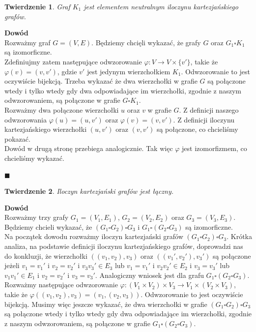 \documentclass[12pt,a4paper,titlepage]{article}
\newtheorem{twr}{Twierdzenie}
\newcommand\tab[1][1cm]{\hspace*{#1}}
\begin{document}
\begin{twr}
Graf $K_1$ jest elementem neutralnym iloczynu kartezjańskiego grafów.
\end{twr}
\tab[-0.6cm]\textbf{Dowód}\\
\tab[0.6cm]Rozważmy graf $G=(V, E)$. Będziemy chcięli wykazać, że grafy $G$ oraz $G_1 \square K_1$ są izomorficzne. \\
\tab[0.6cm]Zdefiniujmy zatem następujące odwzorowanie $\varphi : V \rightarrow V \times \{v'\}$, takie że $\varphi(v) = (v, v')$, gdzie $v'$ jest jedynym wierzchołkiem $K_1$. Odwzorowanie to jest oczywiście bijekcją. Trzeba wykazać że dwa wierzchołki w grafie $G$ są połączone wtedy i tylko wtedy gdy dwa odpowiadające im wierzchołki, zgodnie z naszym odwzorowaniem, są połączone w grafie $G \square K_1$.\\
\tab[0.6cm]Rozważmy dwa połączone wierzchołki $u$ oraz $v$ w grafie $G$. Z definicji naszego odwzorowania $\varphi (u) = (u, v')$ oraz $\varphi(v) = (v, v')$. Z definicji iloczynu kartezjańskiego wierzchołki $(u, v')$ oraz $(v, v')$ są połączone, co chcieliśmy pokazać.\\
\tab[0.6cm]Dowód w drugą stronę przebiega analogicznie. Tak więc $\varphi$ jest izomorfizmem, co chcieliśmy wykazać. 
\begin{flushright}
$\blacksquare$
\end{flushright}
\begin{twr}
Iloczyn kartezjański grafów jest łączny.
\end{twr}
\textbf{Dowód}\\
\tab[0.6cm]Rozważmy trzy grafy $G_1 = (V_1, E_1)$, $G_2 = (V_2, E_2)$ oraz $G_3 = (V_3, E_3)$. Będziemy chcieli wykazać, że $(G_1 \square G_2 ) \square G_3 $ i $G_1 \square ( G_2 \square G_3) $ są izomorficzne.\\
\tab[0.6cm]Na początek dowodu rozważmy iloczyn kartezjański grafów $(G_1 \square G_2 ) \square G_3 $. Krótka analiza, na podstawie definicji iloczynu kartezjańskiego grafów, doprowadzi nas do konkluzji, że wierzchołki $((v_1, v_2), v_3)$ oraz $((v_1', v_2'), v_3')$ są połączone jeżeli $v_1 = v_1'$ i $v_2=v_2'$ i $v_3 v_3' \in E_3$ lub $v_1 = v_1'$ i $v_2 v_2' \in E_2$ i $v_3 = v_3' $ lub $v_1 v_1' \in E_1$ i $v_2=v_2'$ i $v_3= v_3'$. Analogiczny wniosek jest dla grafu $G_1 \square ( G_2 \square G_3) $.\\ 
\tab[0.6cm]Rozważmy następujące odwzorowanie $\varphi : (V_1 \times V_2 ) \times V_3 \rightarrow V_1 \times (V_2 \times V_3)$, takie że $\varphi ((v_1, v_2), v_3) = (v_1, (v_2, v_3))$. Odwzorowanie to jest oczywiście bijekcją. Musimy więc jeszcze wykazać, że dwa wierzchołki w grafie $(G_1 \square G_2 ) \square G_3 $ są połączone wtedy i tylko wtedy gdy dwa odpowiadające im wierzchołki, zgodnie z naszym odwzorowaniem, są połączone w grafie $G_1 \square ( G_2 \square G_3) $.\\
\end{document}
